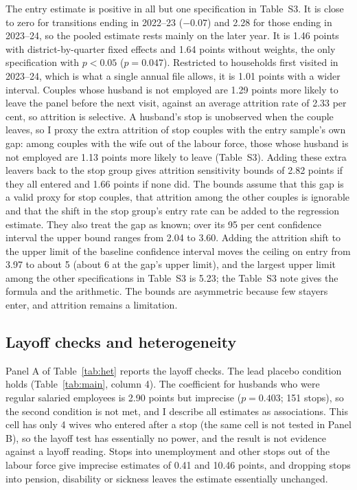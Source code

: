 The entry estimate is positive in all but one specification in Table~S3. It is close to zero for transitions ending in 2022--23 ($-0.07$) and 2.28 for those ending in 2023--24, so the pooled estimate rests mainly on the later year. It is 1.46 points with district-by-quarter fixed effects and 1.64 points without weights, the only specification with $p<0.05$ ($p=0.047$). Restricted to households first visited in 2023--24, which is what a single annual file allows, it is 1.01 points with a wider interval. Couples whose husband is not employed are 1.29 points more likely to leave the panel before the next visit, against an average attrition rate of 2.33 per cent, so attrition is selective. A husband's stop is unobserved when the couple leaves, so I proxy the extra attrition of stop couples with the entry sample's own gap: among couples with the wife out of the labour force, those whose husband is not employed are 1.13 points more likely to leave (Table~S3). Adding these extra leavers back to the stop group gives attrition sensitivity bounds of 2.82 points if they all entered and 1.66 points if none did. The bounds assume that this gap is a valid proxy for stop couples, that attrition among the other couples is ignorable and that the shift in the stop group's entry rate can be added to the regression estimate. They also treat the gap as known; over its 95 per cent confidence interval the upper bound ranges from 2.04 to 3.60. Adding the attrition shift to the upper limit of the baseline confidence interval moves the ceiling on entry from 3.97 to about 5 (about 6 at the gap's upper limit), and the largest upper limit among the other specifications in Table~S3 is 5.23; the Table~S3 note gives the formula and the arithmetic. The bounds are asymmetric because few stayers enter, and attrition remains a limitation.

\subsection{Layoff checks and heterogeneity}
\label{sec:checks}

Panel A of Table~\ref{tab:het} reports the layoff checks. The lead placebo condition holds (Table~\ref{tab:main}, column 4). The coefficient for husbands who were regular salaried employees is 2.90 points but imprecise ($p=0.403$; 151 stops), so the second condition is not met, and I describe all estimates as associations. This cell has only 4 wives who entered after a stop (the same cell is not tested in Panel B), so the layoff test has essentially no power, and the result is not evidence against a layoff reading. Stops into unemployment and other stops out of the labour force give imprecise estimates of 0.41 and 10.46 points, and dropping stops into pension, disability or sickness leaves the estimate essentially unchanged.


